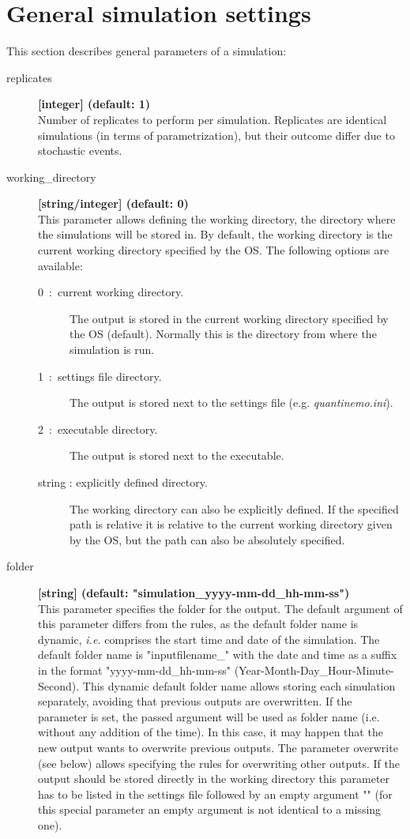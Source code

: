 \documentclass[letterpaper,12pt,oneside]{book}
\begin{document}
\chapter{General simulation settings}\label{chap:GeneralSimulationSettings}
This section describes general parameters of a simulation: 
\begin{description}

 
\item[replicates]\textbf{[integer] (default: 1)}\\
Number of replicates to perform per simulation. Replicates are identical simulations (in terms of parametrization), but their outcome differ due to stochastic events. 

\item[working\_directory]\textbf{[string/integer] (default: 0)}\\
This parameter allows defining the working directory, the directory where the simulations will be stored in. By default, the working directory is the current working directory specified by the OS. The following options are available:
\begin{description}
\item[0~:~current working directory.] The output is stored in the current working directory specified by the OS (default). Normally this is the directory from where the simulation is run. 
\item[1~:~settings file directory.] The output is stored next to the settings file (e.g. \textit{quantinemo.ini}).
\item[2~:~executable directory.] The output is stored next to the executable.  
\item[string : explicitly defined directory.] The working directory can also be explicitly defined. If the specified path is relative it is relative to the current working directory given by the OS, but the path can also be absolutely specified.
\end{description}


\item[folder]\textbf{[string] (default: "simulation\_yyyy-mm-dd\_hh-mm-ss")}\\
This parameter specifies the folder for the output. The default argument of this parameter differs from the rules, as the default folder name is dynamic, \textit{i.e.} comprises the start time and date of the simulation. The default folder name is "inputfilename\_" with the date and time as a suffix in the format "yyyy-mm-dd\_hh-mm-ss" (Year-Month-Day\_Hour-Minute-Second). This dynamic default folder name allows storing each simulation separately, avoiding that previous outputs are overwritten. If the parameter is set, the passed argument will be used as folder name (i.e. without any addition of the time). In this case, it may happen that the new output wants to overwrite previous outputs. The parameter \textsf{overwrite} (see below) allows specifying the rules for overwriting other outputs. If the output should be stored directly in the working directory this parameter has to be listed in the settings file followed by an empty argument "" (for this special parameter an empty argument is not identical to a missing one).


\end{description}
\end{document}
